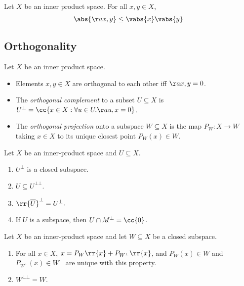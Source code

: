 \documentclass{article}
\begin{document}
\begin{theorem}
  Let $X$ be an inner product space. For all $x,y\in X$,
  \begin{align*}
    \abs{\aa{x,y}}\leq \vabs{x}\vabs{y}
  \end{align*}
\end{theorem}

\subsection{Orthogonality}\label{sec:orthogonality}

\begin{definition}\label{def:orthogonality}
  Let $X$ be an inner product space.
  \begin{itemize}
    \item Elements $x,y\in X$ are orthogonal to each other iff $\aa{x,y}=0$.
    \item The \emph{orthogonal complement} to a subset $U\subseteq X$ is
      $U^\bot = \cc{x \in X : \forall u\in U. \aa{u,x}=0}$.
    \item The \emph{orthogonal projection} onto a subspace $W\subseteq X$
      is the map $P_W : X \to W$ taking $x\in X$ to its unique closest
      point $P_W(x)\in W$.
  \end{itemize}
\end{definition}

\begin{lemma}
  Let $X$ be an inner-product space and $U\subseteq X$.
  \begin{enumerate}
    \item $U^\bot$ is a closed subspace.
    \item $U\subseteq U^{\bot\bot}$.
    \item $\rr{\overline{U}}^\bot=U^\bot$.
    \item If $U$ is a subspace, then $U\cap M^\bot = \cc{0}$.
  \end{enumerate}
\end{lemma}

\begin{theorem}
  Let $X$ be an inner-product space and let $W\subseteq X$ be a closed subspace.
  \begin{enumerate}
    \item For all $x\in X$, $x=P_{W}\rr{x}+P_{W^\bot}\rr{x}$, and $P_W(x)\in W$
      and $P_{W^\bot}(x)\in W^\bot$ are unique with this property.
    \item $W^{\bot\bot}=W$.
  \end{enumerate}
\end{theorem}
\end{document}
